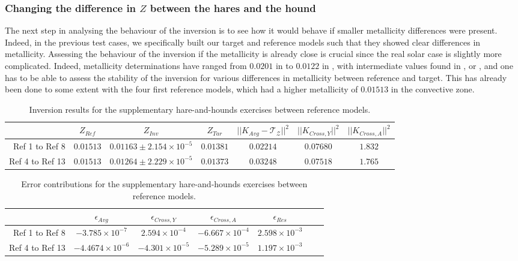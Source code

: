 \documentclass[a4paper,fleqn,usenatbib]{mnras}
\begin{document}
\subsubsection{Changing the difference in $Z$ between the hares and the hound}
The next step in analysing the behaviour of the inversion is to see how it would behave if smaller metallicity differences were present. Indeed, in the previous test cases, we specifically built our target and reference models such that they showed clear differences in metallicity. Assessing the behaviour of the inversion if the metallicity is already close is crucial since the real solar case is slightly more complicated. Indeed, metallicity determinations have ranged from $0.0201$ in \citet{AG} to $0.0122$ in \citet{AspG}, with intermediate values found in \citet{GN93}, \citet{GreSauv} or \citet{Caffau}, and one has to be able to assess the stability of the inversion for various differences in metallicity between reference and target. This has already been done to some extent with the four first reference models, which had a higher metallicity of $0.01513$ in the convective zone.

\begin{table*}
\caption{Inversion results for the supplementary hare-and-hounds exercises between reference models.}
\label{tabInvHHRef}
  \centering
\begin{tabular}{r | c | c | c | c | c | c}
\hline 
& $Z_{Ref}$  & $Z_{Inv}$ & $Z_{Tar}$& $\vert \vert K_{Avg}-\mathcal{T}_{\mathcal{Z}} \vert \vert^{2}$ & $\vert \vert K_{Cross,Y} \vert \vert^{2}$ & $\vert \vert K_{Cross,A} \vert \vert^{2}$ \\ \hline
Ref 1 to Ref 8& $0.01513$ & $0.01163\pm 2.154 \times 10^{-5}$ & $0.01381$& $0.02214$ & $0.07680$ & $1.832$\\  
Ref 4 to Ref 13 & $0.01513$&  $0.01264\pm 2.229 \times 10^{-5}$ & $0.01373$& $0.03248$& $0.07518$& $1.765$\\  
\hline
\end{tabular}
\end{table*}

\begin{table*}
\caption{Error contributions for the supplementary hare-and-hounds exercises between reference models.}
\label{tabErrConRef}
  \centering
\begin{tabular}{r | c | c | c | c | c | c}
\hline
& $\epsilon_{Avg}$  & $\epsilon_{Cross,Y}$ & $\epsilon_{Cross,A}$& $\epsilon_{Res}$  \\ \hline
Ref 1 to Ref 8& $-3.785 \times 10^{-7}$ & $2.594 \times 10^{-4}$ & $-6.667 \times 10^{-4}$ & $2.598 \times 10^{-3}$ \\  
Ref 4 to Ref 13 & $-4.4674 \times 10^{-6}$&  $-4.301 \times 10^{-5}$ & $-5.289 \times 10^{-5}$& $1.197 \times 10^{-3}$\\  
\hline
\end{tabular}
\end{table*}
\end{document}
